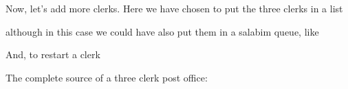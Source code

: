 \documentclass[letterpaper,10pt,english]{sphinxmanual}
\begin{document}
Now, let’s add more clerks. Here we have chosen to put the three clerks in a list

%
\begin{sphinxVerbatim}[commandchars=\\\{\}]
  \PYG{p}{[}    \PYG{p}{]}
\end{sphinxVerbatim}

although in this case we could have also put them in a salabim queue, like

%
\begin{sphinxVerbatim}[commandchars=\\\{\}]
  
   
\end{sphinxVerbatim}

And, to restart a clerk

%
\begin{sphinxVerbatim}[commandchars=\\\{\}]
   
     
         
\end{sphinxVerbatim}

The complete source of a three clerk post office:
\end{document}
